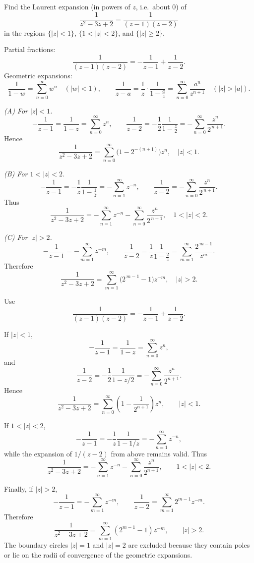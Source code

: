 \begin{problem}[CP-IV-0076]
\label{prob:cp-iv-0076}
Find the Laurent expansion (in powers of $z$, i.e.\ about $0$) of
\[
\frac{1}{z^{2}-3z+2}=\frac{1}{(z-1)(z-2)}
\]
in the regions $\{|z|<1\}$, $\{1<|z|<2\}$, and $\{|z|\ge 2\}$.

Partial fractions:
\[
\frac{1}{(z-1)(z-2)}=-\frac{1}{z-1}+\frac{1}{z-2}.
\]
Geometric expansions:
\[
\frac{1}{1-w}=\sum_{n=0}^{\infty}w^{n}\quad(|w|<1),\qquad
\frac{1}{z-a}=\frac{1}{z}\cdot\frac{1}{1-\frac{a}{z}}
=\sum_{n=0}^{\infty}\frac{a^{n}}{z^{n+1}}\quad(|z|>|a|).
\]

\emph{(A) For $|z|<1$.}
\[
-\frac{1}{z-1}=\frac{1}{1-z}=\sum_{n=0}^{\infty}z^{n},\qquad
\frac{1}{z-2}=-\frac{1}{2}\frac{1}{1-\frac{z}{2}}
=-\sum_{n=0}^{\infty}\frac{z^{n}}{2^{\,n+1}}.
\]
Hence
\[
\boxed{\ \frac{1}{z^{2}-3z+2}=\sum_{n=0}^{\infty}\Big(1-2^{-(n+1)}\Big)z^{n},\quad |z|<1.\ }
\]

\medskip
\emph{(B) For $1<|z|<2$.}
\[
-\frac{1}{z-1}=-\frac{1}{z}\frac{1}{1-\frac{1}{z}}
=-\sum_{n=1}^{\infty} z^{-n},\qquad
\frac{1}{z-2}=-\sum_{n=0}^{\infty}\frac{z^{n}}{2^{\,n+1}}.
\]
Thus
\[
\boxed{\ \frac{1}{z^{2}-3z+2}
	=-\sum_{n=1}^{\infty} z^{-n}-\sum_{n=0}^{\infty}\frac{z^{n}}{2^{\,n+1}},
	\quad 1<|z|<2.\ }
\]

\medskip
\emph{(C) For $|z|>2$.}
\[
-\frac{1}{z-1}=-\sum_{m=1}^{\infty} z^{-m},\qquad
\frac{1}{z-2}=\frac{1}{z}\frac{1}{1-\frac{2}{z}}
=\sum_{m=1}^{\infty}\frac{2^{\,m-1}}{z^{m}}.
\]
Therefore
\[
\boxed{\ \frac{1}{z^{2}-3z+2}
	=\sum_{m=1}^{\infty}\big(2^{\,m-1}-1\big)z^{-m},\quad |z|>2.\ }
\]

\end{problem}

\begin{solution}
Use
\[
\frac1{(z-1)(z-2)}
=
-\frac1{z-1}+\frac1{z-2}.
\]

If \(|z|<1\),
\[
-\frac1{z-1}
=
\frac1{1-z}
=
\sum_{n=0}^{\infty}z^n,
\]
and
\[
\frac1{z-2}
=
-\frac12\frac1{1-z/2}
=
-\sum_{n=0}^{\infty}\frac{z^n}{2^{n+1}}.
\]
Hence
\[
\boxed{
\frac1{z^2-3z+2}
=
\sum_{n=0}^{\infty}
\left(1-\frac1{2^{n+1}}\right)z^n,
\qquad |z|<1.
}
\]

If \(1<|z|<2\),
\[
-\frac1{z-1}
=
-\frac1z\frac1{1-1/z}
=
-\sum_{n=1}^{\infty}z^{-n},
\]
while the expansion of \(1/(z-2)\) from above remains valid. Thus
\[
\boxed{
\frac1{z^2-3z+2}
=
-\sum_{n=1}^{\infty}z^{-n}
-
\sum_{n=0}^{\infty}\frac{z^n}{2^{n+1}},
\qquad 1<|z|<2.
}
\]

Finally, if \(|z|>2\),
\[
-\frac1{z-1}
=
-\sum_{m=1}^{\infty}z^{-m},
\qquad
\frac1{z-2}
=
\sum_{m=1}^{\infty}2^{m-1}z^{-m}.
\]
Therefore
\[
\boxed{
\frac1{z^2-3z+2}
=
\sum_{m=1}^{\infty}(2^{m-1}-1)z^{-m},
\qquad |z|>2.
}
\]
The boundary circles \(|z|=1\) and \(|z|=2\) are excluded because they contain poles or lie on the radii of convergence of the geometric expansions.
\end{solution}


